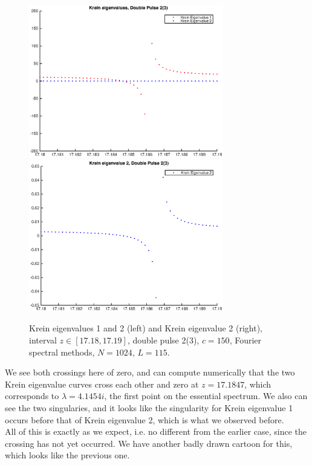 \documentclass[12pt]{article}
\begin{document}
\begin{figure}[H]
	\includegraphics[width=8.5cm]{1500F_dp2_115_kreinzoom3.eps}
	\includegraphics[width=8.5cm]{1500F_dp2_115_kreinzoom4}
	\caption{Krein eigenvalues 1 and 2 (left) and Krein eigenvalue 2 (right), interval $z \in [17.18, 17.19]$, double pulse 2(3), $c = 150$, Fourier spectral methods, $N = 1024$, $L = 115$. }
\end{figure}

We see both crossings here of zero, and can compute numerically that the two Krein eigenvalue curves cross each other and zero at $z = 17.1847$, which corresponds to $\lambda = 4.1454i$, the first point on the essential spectrum. We also can see the two singularies, and it looks like the singularity for Krein eigenvalue 1 occurs before that of Krein eigenvalue 2, which is what we observed before.\\

All of this is exactly as we expect, i.e. no different from the earlier case, since the crossing has not yet occurred. We have another badly drawn cartoon for this, which looks like the previous one.
\end{document}
